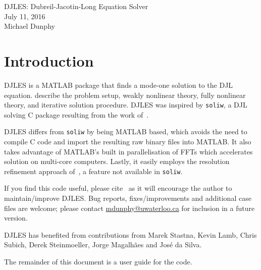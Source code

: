 \documentclass[letterpaper]{article}
\begin{document}
\newpage
\pagestyle{plain}
\setcounter{page}{1}

\begin{center}
\huge{DJLES: Dubreil-Jacotin-Long Equation Solver}\\[1em]
\large{July 11, 2016}\\
Michael Dunphy
\end{center}

\section{Introduction}
DJLES is a MATLAB package that finds a mode-one solution to the DJL equation. \cite{StastnaLamb2002} describe the problem setup, weakly nonlinear theory, fully nonlinear theory, and iterative solution procedure. DJLES was inspired by \verb+soliw+, a DJL solving C package resulting from the work of~\cite{StastnaLamb2002}.

DJLES differs from \verb+soliw+ by being MATLAB based, which avoids the need to compile C code and import the resulting raw binary files into MATLAB. It also takes advantage of MATLAB's built in parallelisation of FFTs which accelerates solution on multi-core computers. Lastly, it easily employs the resolution refinement approach of~\cite{DunphySubichStastna2011}, a feature not available in \verb+soliw+.

If you find this code useful, please cite~\cite{DunphySubichStastna2011} as it will encourage the author to maintain/improve DJLES. Bug reports, fixes/improvements and additional case files are welcome; please contact \href{mailto:mdunphy@uwaterloo.ca}{mdunphy@uwaterloo.ca} for inclusion in a future version.

DJLES has benefited from contributions from Marek Stastna, Kevin Lamb, Chris Subich, Derek Steinmoeller, Jorge Magalh\~aes and Jos\'e da Silva.

The remainder of this document is a user guide for the code.
\end{document}
